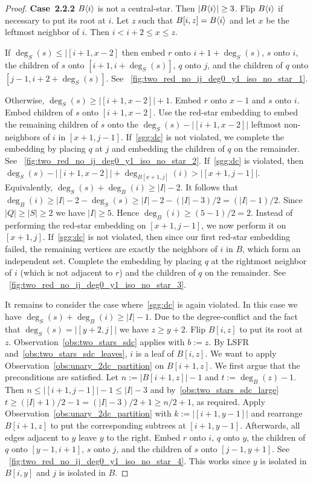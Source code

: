 \documentclass[11pt,a4paper,colorlinks=true,urlcolor=blue,citecolor=red]{article}
\theoremstyle{plain}
\newcommand{\case}[1]{\par\vspace{.5\baselineskip}\noindent\textbf{\sffamily Case~#1}}
\begin{document}
\begin{proof}
  \case{2.2.2} $B\langle{i}\rangle$ is not a central-star. Then
  $|B\langle{i}\rangle|\geq 3$. Flip $B\langle{i}\rangle$ if necessary to put its root
  at $i$. Let $z$ such that $B[i,z]=B\langle{i}\rangle$ and let $x$ be the
  leftmost neighbor of $i$. Then $i<i+2\leq x\leq z$.

  If $\deg_S(s)\leq |[i+1,x-2]$ then embed $r$ onto $i+1+\deg_S(s)$, $s$
  onto $i$, the children of $s$ onto $[i+1,i+\deg_S(s)]$, $q$ onto $j$,
  and the children of $q$ onto $[j-1,i+2+\deg_S(s)]$. See
  \figurename~\ref{fig:two_red_no_ij_deg0_y1_iso_no_star_1}.

  Otherwise, $\deg_S(s)\geq |[i+1,x-2]|+1$. Embed $r$ onto $x-1$ and $s$
  onto $i$. Embed children of $s$ onto $[i+1,x-2]$. Use the
  red-star embedding to embed the remaining children of $s$ onto
  the $\deg_S(s)-|[i+1,x-2]|$ leftmost non-neighbors of $i$ in
  $[x+1,j-1]$. If~\ref{sgg:dc} is not violated, we complete the
  embedding by placing $q$ at $j$ and embedding the children of $q$ on
  the remainder. See
  \figurename~\ref{fig:two_red_no_ij_deg0_y1_iso_no_star_2}.
  If~\ref{sgg:dc} is violated, then
  $\deg_S(s)-|[i+1,x-2]|+\deg_{B[x+1,j]}(i)>|[x+1,j-1]|$. Equivalently,
  $\deg_S(s)+\deg_B(i)\geq |I|-2$. It follows that
  $\deg_B(i)\geq|I|-2-\deg_S(s)\geq|I|-2-(|I|-3)/2=(|I|-1)/2$. Since
  $|Q|\geq|S|\geq2$ we have $|I|\geq 5$. Hence $\deg_B(i)\geq
  (5-1)/2=2$. Instead of performing the red-star embedding on
  $[x+1,j-1]$, we now perform it on $[x+1,j]$. If~\ref{sgg:dc} is not
  violated, then since our first red-star embedding failed, the
  remaining vertices are exactly the neighbors of $i$ in $B$, which
  form an independent set. Complete the embedding by placing $q$ at the
  rightmost neighbor of $i$ (which is not adjacent to $r$) and the
  children of $q$ on the remainder. See
  \figurename~\ref{fig:two_red_no_ij_deg0_y1_iso_no_star_3}.

  It remains to consider the case where~\ref{sgg:dc} is again violated.
  In this case we have $\deg_S(s)+\deg_B(i)\geq |I|-1$. Due to the
  degree-conflict and the fact that $\deg_S(s)=|[y+2,j]|$ we have $z\geq
  y+2$. Flip $B[i,z]$ to put its root at $z$.
  Observation~\ref{obs:two_stars_sdc} applies with $b:=z$. By LSFR
  and~\ref{obs:two_stars_sdc_leaves}, $i$ is a leaf of $B[i,z]$. We want
  to apply Observation~\ref{obs:unary_2dc_partition} on $B[i+1,z]$. We
  first argue that the preconditions are satisfied. Let
  $n:=|B[i+1,z]|-1$ and $t:=\deg_B(z)-1$. Then $n\leq |[i+1,j-1]|-1\leq
  |I|-3$ and by~\ref{obs:two_stars_sdc_large} $t\geq
  (|I|+1)/2-1=(|I|-3)/2+1\geq n/2+1$, as required. Apply
  Observation~\ref{obs:unary_2dc_partition} with $k:=|[i+1,y-1]|$ and
  rearrange $B[i+1,z]$ to put the corresponding subtrees at $[i+1,y-1]$.
  Afterwards, all edges adjacent to $y$ leave $y$ to the right. Embed
  $r$ onto $i$, $q$ onto $y$, the children of $q$ onto $[y-1,i+1]$, $s$
  onto $j$, and the children of $s$ onto $[j-1,y+1]$. See
  \figurename~\ref{fig:two_red_no_ij_deg0_y1_iso_no_star_4}. This works
  since $y$ is isolated in $B[i,y]$ and $j$ is isolated in $B$.


\end{proof}
\end{document}
